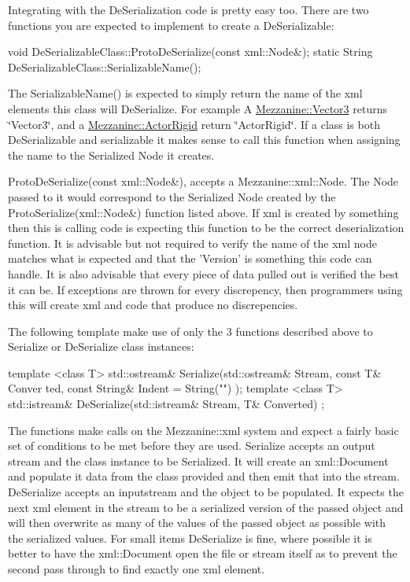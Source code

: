  \par
 Integrating with the DeSerialization code is pretty easy too. There are two functions you are expected to implement to create a DeSerializable: 
\begin{DoxyCode}
 void DeSerializableClass::ProtoDeSerialize(const xml::Node&);
 static String DeSerializableClass::SerializableName();
\end{DoxyCode}
 The SerializableName() is expected to simply return the name of the xml elements this class will DeSerialize. For example A \hyperlink{classMezzanine_1_1Vector3}{Mezzanine::Vector3} returns \char`\"{}Vector3\char`\"{}, and a \hyperlink{classMezzanine_1_1ActorRigid}{Mezzanine::ActorRigid} return \char`\"{}ActorRigid\char`\"{}. If a class is both DeSerializable and serializable it makes sense to call this function when assigning the name to the Serialized Node it creates. \par
 \par
 ProtoDeSerialize(const xml::Node\&), accepts a Mezzanine::xml::Node. The Node passed to it would correspond to the Serialized Node created by the ProtoSerialize(xml::Node\&) function listed above. If xml is created by something then this is calling code is expecting this function to be the correct deserialization function. It is advisable but not required to verify the name of the xml node matches what is expected and that the 'Version' is something this code can handle. It is also advisable that every piece of data pulled out is verified the best it can be. If exceptions are thrown for every discrepency, then programmers using this will create xml and code that produce no discrepencies. \par
 \par
 The following template make use of only the 3 functions described above to Serialize or DeSerialize class instances: 
\begin{DoxyCode}
 template <class T> std::ostream& Serialize(std::ostream& Stream, const T& Conver
      ted, const String& Indent = String("") );
 template <class T> std::istream& DeSerialize(std::istream& Stream, T& Converted)
      ;
\end{DoxyCode}
 The functions make calls on the Mezzanine::xml system and expect a fairly basic set of conditions to be met before they are used. Serialize accepts an output stream and the class instance to be Serialized. It will create an xml::Document and populate it data from the class provided and then emit that into the stream. DeSerialize accepts an inputstream and the object to be populated. It expects the next xml element in the stream to be a serialized version of the passed object and will then overwrite as many of the values of the passed object as possible with the serialized values. For small items DeSerialize is fine, where possible it is better to have the xml::Document open the file or stream itself as to prevent the second pass through to find exactly one xml element. \par
